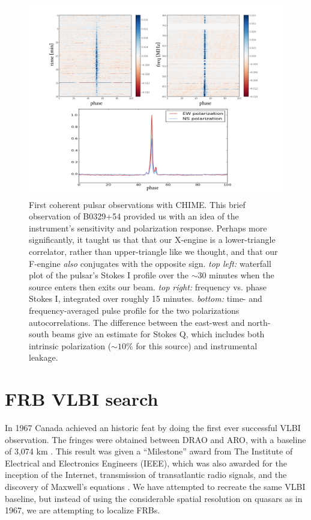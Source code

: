 \begin{figure}[!h]
\label{fig-bf_diagram}
\begin{center}
\includegraphics[trim={0.8in, 0in, 0in, 0in}, scale=0.5]{./figures/beamforming/b0329_testing.jpeg}
\caption[abc]{First coherent pulsar observations with CHIME. This 
brief observation of B0329+54 provided us with an idea 
of the instrument's sensitivity and polarization response. 
Perhaps more significantly, it taught us that 
that our X-engine is a lower-triangle correlator, rather than 
upper-triangle like we thought, and that our F-engine \textit{also}
conjugates with the opposite sign. \textit{top left:} waterfall plot
of the pulsar's Stokes I profile over the $\sim$30 minutes when the 
source enters then exits our beam. \textit{top right:} frequency 
vs. phase Stokes I, integrated over roughly 15 minutes. 
\textit{bottom:} time- and frequency-averaged pulse profile 
for the two polarizations autocorrelations. The difference between 
the east-west and north-south beams give an estimate for Stokes Q, which 
includes both intrinsic polarization ($\sim10\%$ for this source)
and instrumental leakage.} 
\vspace{0.4cm}   
\end{center}
\end{figure}


\section{FRB VLBI search}

In 1967 Canada achieved an historic feat by doing 
the first ever successful VLBI observation. The fringes were 
obtained between DRAO and ARO, with a baseline of 3,074 km \citep{1967Natur.215...38B}. 
This result was given a ``Milestone'' award from 
The Institute of Electrical and Electronics Engineers (IEEE), 
which was also awarded for the inception of the Internet, transmission 
of transatlantic radio signals, and the discovery of Maxwell's equations \citep{IEEEmilestone}. 
We have attempted to recreate the same VLBI baseline, but instead of 
using the considerable spatial resolution on quasars as in 1967, 
we are attempting to localize FRBs. 


